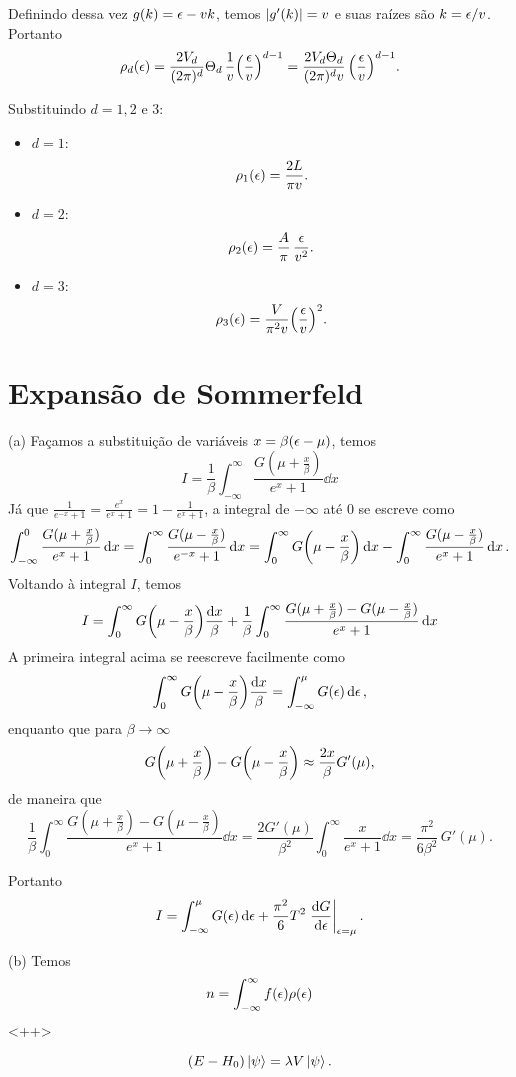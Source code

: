 \documentclass[a4paper,10pt]{article}
\begin{document}
Definindo dessa vez $g(k) = \epsilon - vk$, temos $\abs{g'(k)} = v$ e suas raízes são $k = \epsilon/v$. Portanto
$$
\rho_d(\epsilon) = \frac{2V_d}{(2\pi)^d} \Theta_d \, \frac{1}{v}
\qty(\frac{\epsilon}{v})^{d-1} = \frac{2 V_d \Theta_d}{(2\pi)^d v} \, \qty(\frac{\epsilon}{v})^{d-1}.
$$

Substituindo $d = 1, 2$ e $3$:
\begin{itemize}
\item $d = 1$:
$$
\rho_1(\epsilon) = \frac{2 L}{\pi v}.
$$
\item $d = 2$:
$$
\rho_2(\epsilon) = \frac{A}{\pi} \, \frac{\epsilon}{v^2}.
$$
\item $d = 3$:
$$
\rho_3(\epsilon) = \frac{V}{\pi^2 v} \qty(\frac{\epsilon}{v})^2.
$$
\end{itemize}

\pagebreak

\section{Expansão de Sommerfeld}

(a) Façamos a substituição de variáveis $x = \beta(\epsilon - \mu)$, temos
$$
I = \frac{1}{\beta} \int_{-\infty}^{\infty} \frac{G(\mu + \frac{x}{\beta})}{e^{x} + 1} \dd{x}
$$
Já que $\displaystyle{\frac{1}{e^{-x} + 1} = \frac{e^x}{e^x + 1} = 1 - \frac{1}{e^x + 1}}$, a integral de $-\infty$ até $0$ se escreve como
$$
\int_{-\infty}^0 \frac{G(\mu + \frac{x}{\beta})}{e^{x} + 1} \dd{x} =
\int_0^{\infty} \frac{G(\mu - \frac{x}{\beta})}{e^{-x} + 1} \dd{x} =
\int_0^{\infty} G\qty(\mu - \frac{x}{\beta}) \dd{x} -
\int_0^{\infty} \frac{G(\mu - \frac{x}{\beta})}{e^{x} + 1} \dd{x}.
$$
Voltando à integral $I$, temos
$$
I =
\int_0^{\infty} G\qty(\mu - \frac{x}{\beta}) \frac{\dd{x}}{\beta} +
\frac{1}{\beta}
\int_0^{\infty}\frac{G(\mu + \frac{x}{\beta}) - G(\mu - \frac{x}{\beta})}{e^x + 1}\dd{x}
$$
A primeira integral acima se reescreve facilmente como
$$
\int_0^\infty G\qty(\mu - \frac{x}{\beta}) \frac{\dd{x}}{\beta} =
\int_{-\infty}^\mu G(\epsilon) \dd{\epsilon},
$$
enquanto que para $\beta \to \infty$
$$
G\qty(\mu + \frac{x}{\beta}) - G\qty(\mu - \frac{x}{\beta}) \approx \frac{2x}{\beta} G'(\mu),
$$
de maneira que
$$
\frac{1}{\beta}
\int_0^{\infty}\frac{G(\mu + \frac{x}{\beta}) - G(\mu - \frac{x}{\beta})}{e^x + 1}\dd{x}=
\frac{2 G'(\mu)}{\beta^2}
\int_0^{\infty}\frac{x}{e^x + 1}\dd{x} =
\frac{\pi^2}{6 \beta^2} \, G'(\mu).
$$

Portanto
$$
I = \int_{-\infty}^{\mu} G(\eps) \dd{\eps} + \frac{\pi^2}{6} T^2 \eval{\dv{G}{\eps}}_{\eps = \mu}.
$$

(b) Temos
$$
n = \int_{-\infty}^{\infty} f(\epsilon) \rho(\epsilon)
$$
<++>

\pagebreak

\begin{equation} \label{eq:pertub}
(E - H_0) \ket{\psi} = \lambda V \ket{\psi}.
\end{equation}
\end{document}
